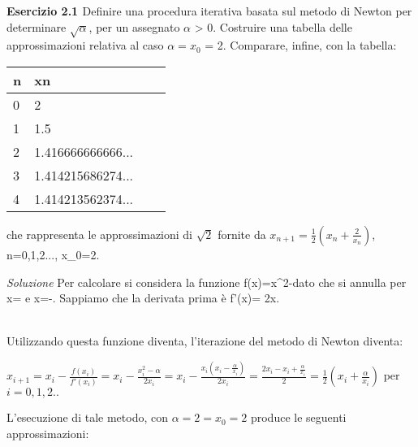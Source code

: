 \documentclass[20pt,a4paper]{book}
\begin{document}
 
\textbf{\Large{Esercizio 2.1 }} Definire una procedura iterativa basata sul metodo di Newton
per determinare \begin{math}\sqrt{\alpha}\end{math}, per un assegnato \begin{math}\alpha \end{math} > 0. Costruire una tabella delle
approssimazioni relativa al caso \begin{math}\alpha = x_{0} \end{math} = 2. Comparare, infine, con la tabella:

\vspace{3mm}

\begin{tabular}{|l|l|l|l|}
\hline
n & xn \\
\hline
0 & 2 \\
\hline
1 & 1.5 \\
\hline
2 & 1.416666666666...\\
\hline
3 & 1.414215686274...\\
\hline
4 & 1.414213562374...\\
\hline
\end{tabular}

\vspace{3mm}
che rappresenta le approssimazioni di \begin{math} \sqrt{2} \end{math} fornite da \begin{math} x_{n+1}=\frac{1}{2}(x_{n}+\frac{2}{x_{n}})\end{math}, n=0,1,2..., x_{0}=2.


\textit{Soluzione}
Per calcolare \sqrt{\alpha} si considera la funzione f(x)=x^{2}-\alpha dato che si annulla per x=\sqrt{\alpha} e x=-\sqrt{\alpha}. Sappiamo che la derivata prima è f'(x)= 2x.

\\Utilizzando questa funzione diventa, l'iterazione del metodo di Newton diventa:

\begin{math}
x_{i+1}=x_{i}-\frac{f(x_{i})}{f'(x_{i})}=x_{i}-\frac{x_{i}^{2}-\alpha}{2x_{i}}=x_{i}-\frac{x_{i}(x_{i}-\frac{\alpha}{x_{i}})}{2x_{i}}=\frac{2x_{i}-x_{i}+\frac{\alpha}{x_{i}}}{2}=\frac{1}{2}(x_{i}+\frac{\alpha}{x_{i}})\end{math} per \begin{math}i=0,1,2..\end{math}

L'esecuzione di tale metodo, con \begin{math} \alpha= 2= x_{0}=2 \end{math} produce le seguenti approssimazioni:
\end{document}
